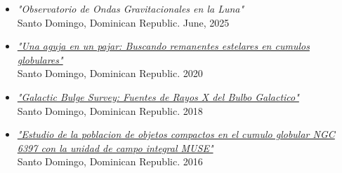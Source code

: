 \documentclass[letterpaper,10pt]{article}
\begin{document}
\begin{itemize}[label=$\blacktriangleright$]


    \item \textit{"Observatorio de Ondas Gravitacionales en la Luna"} \\ Santo Domingo, Dominican Republic. June, 2025


    \item \textit{\href{https://manuelpm.me/AstrodomJulio2020/}{"Una aguja en un pajar: Buscando remanentes estelares en cumulos globulares"}} \\ Santo Domingo, Dominican Republic. 2020


	\item \textit{\href{http://manuelpm.me/AstrodomGBStalk/}{"Galactic Bulge Survey: Fuentes de Rayos X del Bulbo Galactico"}} \\ Santo Domingo, Dominican Republic. 2018



	\item \textit{\href{http://manuelpm.me/Astrodomtalk/}{"Estudio de la poblacion de objetos compactos en el cumulo globular NGC 6397 con la unidad de campo integral MUSE"}} \\Santo Domingo, Dominican Republic. 2016

\end{itemize}






%
%
\end{document}

